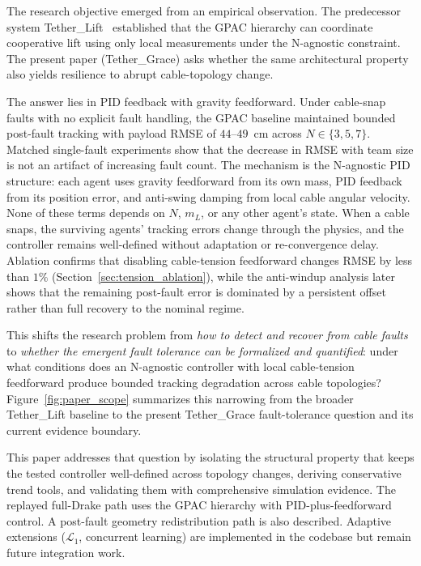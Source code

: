 
The research objective emerged from an empirical observation. The predecessor system Tether\_Lift~\cite{hajieghrary2026tetherlift} established that the GPAC hierarchy can coordinate cooperative lift using only local measurements under the N-agnostic constraint. The present paper (Tether\_Grace) asks whether the same architectural property also yields resilience to abrupt cable-topology change.

The answer lies in PID feedback with gravity feedforward. Under cable-snap faults with no explicit fault handling, the GPAC baseline maintained bounded post-fault tracking with payload RMSE of $44$--$49$~cm across $N \in \{3, 5, 7\}$. Matched single-fault experiments show that the decrease in RMSE with team size is not an artifact of increasing fault count. The mechanism is the N-agnostic PID structure: each agent uses gravity feedforward from its own mass, PID feedback from its position error, and anti-swing damping from local cable angular velocity. None of these terms depends on $N$, $m_L$, or any other agent's state. When a cable snaps, the surviving agents' tracking errors change through the physics, and the controller remains well-defined without adaptation or re-convergence delay. Ablation confirms that disabling cable-tension feedforward changes RMSE by less than $1\%$ (Section~\ref{sec:tension_ablation}), while the anti-windup analysis later shows that the remaining post-fault error is dominated by a persistent offset rather than full recovery to the nominal regime.

This shifts the research problem from \emph{how to detect and recover from cable faults} to \emph{whether the emergent fault tolerance can be formalized and quantified}: under what conditions does an N-agnostic controller with local cable-tension feedforward produce bounded tracking degradation across cable topologies? Figure~\ref{fig:paper_scope} summarizes this narrowing from the broader Tether\_Lift baseline to the present Tether\_Grace fault-tolerance question and its current evidence boundary.


This paper addresses that question by isolating the structural property that keeps the tested controller well-defined across topology changes, deriving conservative trend tools, and validating them with comprehensive simulation evidence. The replayed full-Drake path uses the GPAC hierarchy with PID-plus-feedforward control. A post-fault geometry redistribution path is also described. Adaptive extensions ($\mathcal{L}_1$, concurrent learning) are implemented in the codebase but remain future integration work.

